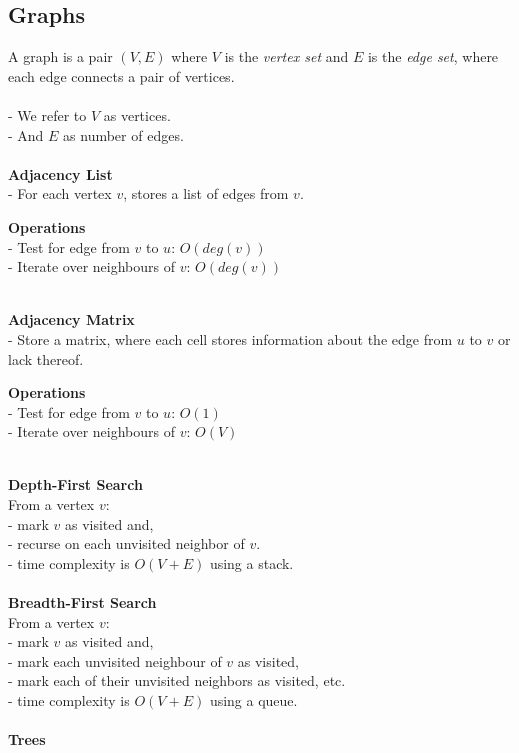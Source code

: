 \documentclass{article}
\begin{document}
\subsection{Graphs}
A graph is a pair $(V, E)$ where $V$ is the \emph{vertex set} and $E$ is the \emph{edge set}, where each edge connects a pair of vertices.
\\\\
- We refer to $V$ as vertices. \\
- And $E$ as number of edges.
\\\\
\textbf{Adjacency List} \\
- For each vertex $v$, stores a list of edges from $v$.
\begin{tcolorbox}
    \textbf{Operations} \\
    - Test for edge from $v$ to $u$: $O(deg(v))$ \\
    - Iterate over neighbours of $v$: $O(deg(v))$
\end{tcolorbox}
~\\
\textbf{Adjacency Matrix} \\
- Store a matrix, where each cell stores information about the edge from $u$ to $v$ or lack thereof.
\begin{tcolorbox}
    \textbf{Operations} \\
    - Test for edge from $v$ to $u$: $O(1)$ \\
    - Iterate over neighbours of $v$: $O(V)$
\end{tcolorbox}
~\\
\textbf{Depth-First Search} \\
From a vertex $v$: \\
- mark $v$ as visited and, \\
- recurse on each unvisited neighbor of $v$. \\
- time complexity is $O(V + E)$ using a stack.
\\\\
\textbf{Breadth-First Search} \\
From a vertex $v$: \\
- mark $v$ as visited and, \\
- mark each unvisited neighbour of $v$ as visited, \\
- mark each of their unvisited neighbors as visited, etc. \\
- time complexity is $O(V + E)$ using a queue.
\\\\
\textbf{Trees}
\end{document}
